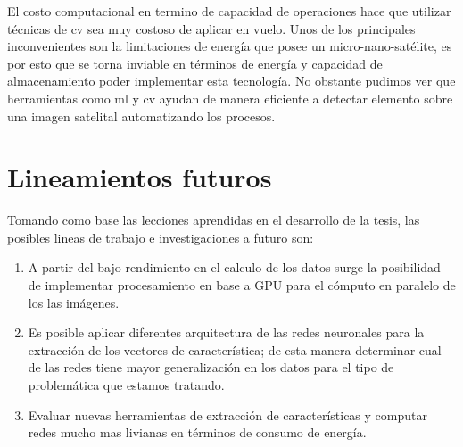 El costo computacional en termino de capacidad de operaciones hace que utilizar técnicas de \ac{cv} sea  muy costoso de aplicar en vuelo. Unos de los principales inconvenientes son la limitaciones de energía que posee un micro-nano-satélite, es por esto que se torna inviable en términos de energía y capacidad de almacenamiento poder implementar esta tecnología. No obstante pudimos ver que herramientas como \ac{ml} y \ac{cv} ayudan de manera eficiente a detectar elemento sobre una imagen satelital automatizando los procesos.



\section{Lineamientos futuros}\label{lineafuturas}
Tomando como base las lecciones aprendidas en el desarrollo de la tesis, las posibles lineas de trabajo e investigaciones a futuro son:
\begin{enumerate}
 \item A partir del bajo rendimiento en el calculo de los datos surge la posibilidad de implementar procesamiento en base a GPU para el cómputo en paralelo de los las imágenes.
 \item Es posible aplicar diferentes arquitectura de las redes neuronales para la extracción de los vectores de característica; de esta manera determinar cual de las redes tiene mayor generalización en los datos para el tipo de problemática que estamos tratando.
 \item Evaluar nuevas herramientas de extracción de características y computar redes mucho mas livianas en términos de consumo de energía.
\end{enumerate}